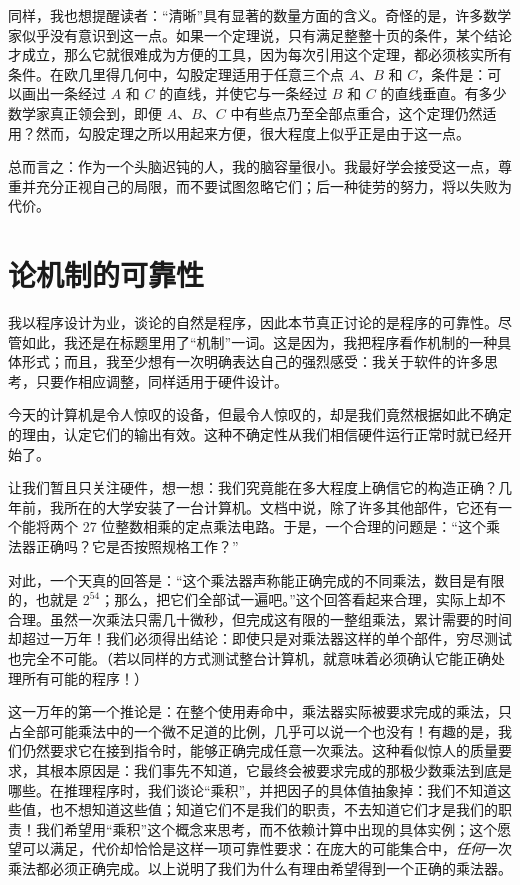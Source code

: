 \documentclass[twoside,11pt,fontset=none]{ctexbook}
\begin{document}
同样，我也想提醒读者：“清晰”具有显著的数量方面的含义。奇怪的是，许多数学家似乎没有意识到这一点。如果一个定理说，只有满足整整十页的条件，某个结论才成立，那么它就很难成为方便的工具，因为每次引用这个定理，都必须核实所有条件。在欧几里得几何中，勾股定理适用于任意三个点 $A$、$B$ 和 $C$，条件是：可以画出一条经过 $A$ 和 $C$ 的直线，并使它与一条经过 $B$ 和 $C$ 的直线垂直。有多少数学家真正领会到，即便 $A$、$B$、$C$ 中有些点乃至全部点重合，这个定理仍然适用？然而，勾股定理之所以用起来方便，很大程度上似乎正是由于这一点。

总而言之：作为一个头脑迟钝的人，我的脑容量很小。我最好学会接受这一点，尊重并充分正视自己的局限，而不要试图忽略它们；后一种徒劳的努力，将以失败为代价。

\section[论机制的可靠性]{论机制的可靠性}
\label{sec:realiability-of-mechanisms}

我以程序设计为业，谈论的自然是程序，因此本节真正讨论的是程序的可靠性。尽管如此，我还是在标题里用了“机制”一词。这是因为，我把程序看作机制的一种具体形式；而且，我至少想有一次明确表达自己的强烈感受：我关于软件的许多思考，只要作相应调整，同样适用于硬件设计。

今天的计算机是令人惊叹的设备，但最令人惊叹的，却是我们竟然根据如此不确定的理由，认定它们的输出有效。这种不确定性从我们相信硬件运行正常时就已经开始了。

让我们暂且只关注硬件，想一想：我们究竟能在多大程度上确信它的构造正确？几年前，我所在的大学安装了一台计算机。文档中说，除了许多其他部件，它还有一个能将两个 27 位整数相乘的定点乘法电路。于是，一个合理的问题是：“这个乘法器正确吗？它是否按照规格工作？”

对此，一个天真的回答是：“这个乘法器声称能正确完成的不同乘法，数目是有限的，也就是 $2^{54}$；那么，把它们全部试一遍吧。”这个回答看起来合理，实际上却不合理。虽然一次乘法只需几十微秒，但完成这有限的一整组乘法，累计需要的时间却超过一万年！我们必须得出结论：即使只是对乘法器这样的单个部件，穷尽测试也完全不可能。（若以同样的方式测试整台计算机，就意味着必须确认它能正确处理所有可能的程序！）

这一万年的第一个推论是：在整个使用寿命中，乘法器实际被要求完成的乘法，只占全部可能乘法中的一个微不足道的比例，几乎可以说一个也没有！有趣的是，我们仍然要求它在接到指令时，能够正确完成任意一次乘法。这种看似惊人的质量要求，其根本原因是：我们事先不知道，它最终会被要求完成的那极少数乘法到底是哪些。在推理程序时，我们谈论“乘积”，并把因子的具体值抽象掉：我们不知道这些值，也不想知道这些值；知道它们不是我们的职责，不去知道它们才是我们的职责！我们希望用“乘积”这个概念来思考，而不依赖计算中出现的具体实例；这个愿望可以满足，代价却恰恰是这样一项可靠性要求：在庞大的可能集合中，\textit{任何}一次乘法都必须正确完成。以上说明了我们为什么有理由希望得到一个正确的乘法器。
\end{document}
